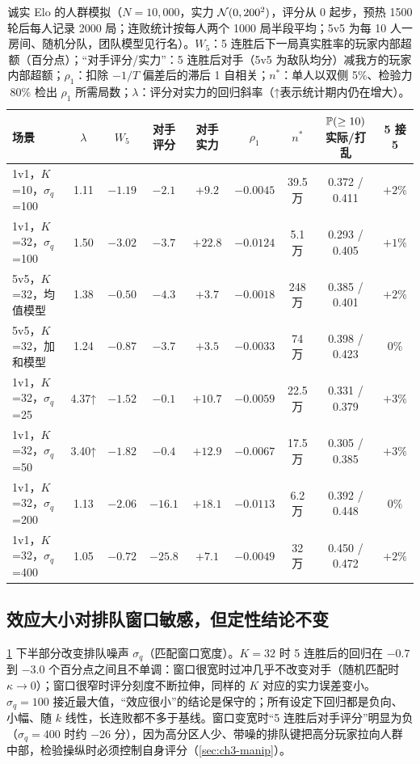 \begin{table}[htbp]
\centering\small
\caption{诚实 Elo 的人群模拟（$N=10{,}000$，实力 $\mathcal{N}(0,200^2)$，评分从 0 起步，预热 1500 轮后每人记录 2000 局；连败统计按每人两个 1000 局半段平均；5v5 为每 10 人一房间、随机分队，团队模型见行名）。$W_5$：5 连胜后下一局真实胜率的玩家内部超额（百分点）；“对手评分/实力”：5 连胜后对手（5v5 为敌队均分）减我方的玩家内部超额；$\rho_1$：扣除 $-1/T$ 偏差后的滞后 1 自相关；$n^*$：单人以双侧 5\%、检验力 80\% 检出 $\rho_1$ 所需局数；$\lambda$：评分对实力的回归斜率（↑表示统计期内仍在增大）。}
\label{tab:ch3-elo}
\footnotesize
\setlength{\tabcolsep}{3pt}
\begin{tabular}{lcccccccc}
\toprule
场景 & $\lambda$ & $W_5$ & 对手评分 & 对手实力 & $\rho_1$ & $n^*$ & $\mathbb{P}(\ge10)$ 实际/打乱 & 5 接 5 \\
\midrule
1v1，$K$=10，$\sigma_q$=100 & 1.11 & $-1.19$ & $-2.1$ & $+9.2$ & $-0.0045$ & 39.5 万 & 0.372 / 0.411 & $+2\%$ \\
1v1，$K$=32，$\sigma_q$=100 & 1.50 & $-3.02$ & $-3.7$ & $+22.8$ & $-0.0124$ & 5.1 万 & 0.293 / 0.405 & $+1\%$ \\
5v5，$K$=32，均值模型 & 1.38 & $-0.50$ & $-4.3$ & $+3.7$ & $-0.0018$ & 248 万 & 0.385 / 0.401 & $+2\%$ \\
5v5，$K$=32，加和模型 & 1.24 & $-0.87$ & $-3.7$ & $+3.5$ & $-0.0033$ & 74 万 & 0.398 / 0.423 & $0\%$ \\
\midrule
1v1，$K$=32，$\sigma_q$=25 & 4.37↑ & $-1.52$ & $-0.1$ & $+10.7$ & $-0.0059$ & 22.5 万 & 0.331 / 0.379 & $+3\%$ \\
1v1，$K$=32，$\sigma_q$=50 & 3.40↑ & $-1.82$ & $-0.4$ & $+12.9$ & $-0.0067$ & 17.5 万 & 0.305 / 0.385 & $+3\%$ \\
1v1，$K$=32，$\sigma_q$=200 & 1.13 & $-2.06$ & $-16.1$ & $+18.1$ & $-0.0113$ & 6.2 万 & 0.392 / 0.448 & $0\%$ \\
1v1，$K$=32，$\sigma_q$=400 & 1.05 & $-0.72$ & $-25.8$ & $+7.1$ & $-0.0049$ & 32 万 & 0.450 / 0.472 & $+2\%$ \\
\bottomrule
\end{tabular}
\end{table}

\subsection{效应大小对排队窗口敏感，但定性结论不变}

\cref{tab:ch3-elo} 下半部分改变排队噪声 $\sigma_q$（匹配窗口宽度）。$K=32$ 时 5 连胜后的回归在 $-0.7$ 到 $-3.0$ 个百分点之间且不单调：窗口很宽时过冲几乎不改变对手（随机匹配时 $\kappa\to0$）；窗口很窄时评分刻度不断拉伸，同样的 $K$ 对应的实力误差变小。$\sigma_q=100$ 接近最大值，“效应很小”的结论是保守的；所有设定下回归都是负向、小幅、随 $k$ 线性，长连败都不多于基线。窗口变宽时“5 连胜后对手评分”明显为负（$\sigma_q=400$ 时约 $-26$ 分），因为高分区人少、带噪的排队键把高分玩家拉向人群中部，检验操纵时必须控制自身评分（\cref{sec:ch3-manip}）\tagOwn{}。

